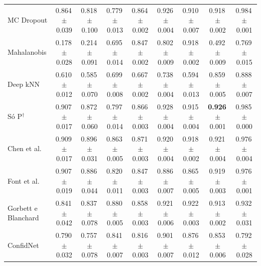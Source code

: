 \begin{table}[t]
{\begin{tabular}{lcccccccc}
  MC Dropout & 0.864\,{\scriptsize$\pm$0.039} & 0.818\,{\scriptsize$\pm$0.100} & 0.779\,{\scriptsize$\pm$0.013} & 0.864\,{\scriptsize$\pm$0.002} & 0.926\,{\scriptsize$\pm$0.004} & 0.910\,{\scriptsize$\pm$0.007} & 0.918\,{\scriptsize$\pm$0.002} & 0.984\,{\scriptsize$\pm$0.001} \\
  Mahalanobis & 0.178\,{\scriptsize$\pm$0.028} & 0.214\,{\scriptsize$\pm$0.091} & 0.695\,{\scriptsize$\pm$0.014} & 0.847\,{\scriptsize$\pm$0.002} & 0.802\,{\scriptsize$\pm$0.009} & 0.918\,{\scriptsize$\pm$0.002} & 0.492\,{\scriptsize$\pm$0.009} & 0.769\,{\scriptsize$\pm$0.015} \\
  Deep kNN & 0.610\,{\scriptsize$\pm$0.012} & 0.585\,{\scriptsize$\pm$0.070} & 0.699\,{\scriptsize$\pm$0.008} & 0.667\,{\scriptsize$\pm$0.002} & 0.738\,{\scriptsize$\pm$0.004} & 0.594\,{\scriptsize$\pm$0.013} & 0.859\,{\scriptsize$\pm$0.005} & 0.888\,{\scriptsize$\pm$0.007} \\
  \midrule
  Só P$^\dagger$ & 0.907\,{\scriptsize$\pm$0.017} & 0.872\,{\scriptsize$\pm$0.060} & 0.797\,{\scriptsize$\pm$0.014} & 0.866\,{\scriptsize$\pm$0.003} & 0.928\,{\scriptsize$\pm$0.004} & 0.915\,{\scriptsize$\pm$0.004} & \textbf{0.926}\,{\scriptsize$\pm$0.001} & 0.985\,{\scriptsize$\pm$0.000} \\
  Chen et al.~\cite{chen2019} & 0.909\,{\scriptsize$\pm$0.017} & 0.896\,{\scriptsize$\pm$0.031} & 0.863\,{\scriptsize$\pm$0.005} & 0.871\,{\scriptsize$\pm$0.003} & 0.920\,{\scriptsize$\pm$0.004} & 0.918\,{\scriptsize$\pm$0.002} & 0.921\,{\scriptsize$\pm$0.004} & 0.976\,{\scriptsize$\pm$0.004} \\
  Font et al.~\cite{font2025} & 0.907\,{\scriptsize$\pm$0.019} & 0.886\,{\scriptsize$\pm$0.044} & 0.820\,{\scriptsize$\pm$0.011} & 0.847\,{\scriptsize$\pm$0.003} & 0.886\,{\scriptsize$\pm$0.007} & 0.865\,{\scriptsize$\pm$0.005} & 0.919\,{\scriptsize$\pm$0.003} & 0.976\,{\scriptsize$\pm$0.001} \\
  Gorbett e Blanchard~\cite{gorbett2022} & 0.841\,{\scriptsize$\pm$0.042} & 0.837\,{\scriptsize$\pm$0.078} & 0.880\,{\scriptsize$\pm$0.005} & 0.858\,{\scriptsize$\pm$0.003} & 0.921\,{\scriptsize$\pm$0.006} & 0.922\,{\scriptsize$\pm$0.003} & 0.913\,{\scriptsize$\pm$0.002} & 0.932\,{\scriptsize$\pm$0.031} \\
  ConfidNet~\cite{corbiere2019} & 0.790\,{\scriptsize$\pm$0.032} & 0.757\,{\scriptsize$\pm$0.078} & 0.841\,{\scriptsize$\pm$0.007} & 0.816\,{\scriptsize$\pm$0.003} & 0.901\,{\scriptsize$\pm$0.007} & 0.876\,{\scriptsize$\pm$0.012} & 0.853\,{\scriptsize$\pm$0.006} & 0.792\,{\scriptsize$\pm$0.028} \\

\end{tabular}}
\end{table}

